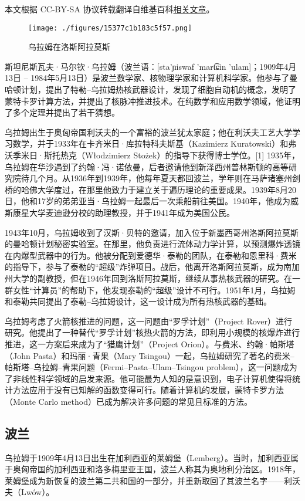 
本文根据 CC-BY-SA 协议转载翻译自维基百科\href{https://en.wikipedia.org/wiki/Stanis\%C5\%82aw_Ulam}{相关文章}。
\begin{figure}[ht]
\centering
\texttt{[image: ./figures/15377c1b183c5f57.png]}
\caption{乌拉姆在洛斯阿拉莫斯} \label{fig_Ulam_1}
\end{figure}
斯坦尼斯瓦夫·马尔钦·乌拉姆（波兰语：[sta'ɲiswaf 'mart͡ɕin 'ulam]；1909年4月13日 – 1984年5月13日）是波兰数学家、核物理学家和计算机科学家。他参与了曼哈顿计划，提出了特勒–乌拉姆热核武器设计，发现了细胞自动机的概念，发明了蒙特卡罗计算方法，并提出了核脉冲推进技术。在纯数学和应用数学领域，他证明了多个定理并提出了若干猜想。

乌拉姆出生于奥匈帝国利沃夫的一个富裕的波兰犹太家庭；他在利沃夫工艺大学学习数学，并于1933年在卡齐米日·库拉特科夫斯基（Kazimierz Kuratowski）和弗沃季米日·斯托热克（Włodzimierz Stożek）的指导下获得博士学位。[1] 1935年，乌拉姆在华沙遇到了约翰·冯·诺依曼，后者邀请他到新泽西州普林斯顿的高等研究院待几个月。从1936年到1939年，他每年夏天都回波兰，学年则在马萨诸塞州剑桥的哈佛大学度过，在那里他致力于建立关于遍历理论的重要成果。1939年8月20日，他和17岁的弟弟亚当·乌拉姆一起最后一次乘船前往美国。1940年，他成为威斯康星大学麦迪逊分校的助理教授，并于1941年成为美国公民。

1943年10月，乌拉姆收到了汉斯·贝特的邀请，加入位于新墨西哥州洛斯阿拉莫斯的曼哈顿计划秘密实验室。在那里，他负责进行流体动力学计算，以预测爆炸透镜在内爆型武器中的行为。他被分配到爱德华·泰勒的团队，在泰勒和恩里科·费米的指导下，参与了泰勒的“超级”炸弹项目。战后，他离开洛斯阿拉莫斯，成为南加州大学的副教授，但在1946年回到洛斯阿拉莫斯，继续从事热核武器的研究。在一群女性“计算员”的帮助下，他发现泰勒的“超级”设计不可行。1951年1月，乌拉姆和泰勒共同提出了泰勒–乌拉姆设计，这一设计成为所有热核武器的基础。

乌拉姆考虑了火箭核推进的问题，这一问题由“罗孚计划”（Project Rover）进行研究。他提出了一种替代“罗孚计划”核热火箭的方法，即利用小规模的核爆炸进行推进，这一方案后来成为了“猎鹰计划”（Project Orion）。与费米、约翰·帕斯塔（John Pasta）和玛丽·青果（Mary Tsingou）一起，乌拉姆研究了著名的费米–帕斯塔–乌拉姆–青果问题（Fermi–Pasta–Ulam–Tsingou problem），这一问题成为了非线性科学领域的启发来源。他可能最为人知的是意识到，电子计算机使得将统计方法应用于没有已知解的函数变得可行。随着计算机的发展，蒙特卡罗方法（Monte Carlo method）已成为解决许多问题的常见且标准的方法。
\subsection{波兰}  
乌拉姆于1909年4月13日出生在加利西亚的莱姆堡（Lemberg）。当时，加利西亚属于奥匈帝国的加利西亚和洛多梅里亚王国，波兰人称其为奥地利分治区。1918年，莱姆堡成为新恢复的波兰第二共和国的一部分，并重新取回了其波兰名字——利沃夫（Lwów）。


